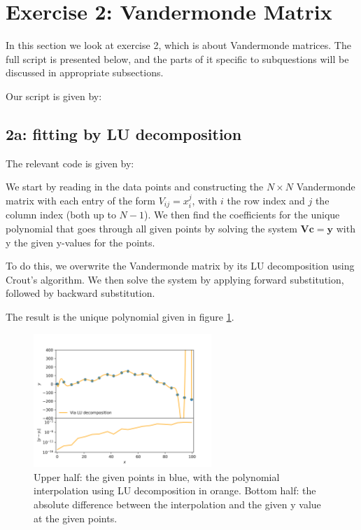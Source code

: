 \section{Exercise 2: Vandermonde Matrix}

In this section we look at exercise 2, which is about Vandermonde matrices. The full script is presented below, and the parts of it specific to subquestions will be discussed in appropriate subsections.

Our script is given by:


\subsection{2a: fitting by LU decomposition}
The relevant code is given by:


We start by reading in the data points and constructing the $N \times N$ Vandermonde matrix with each entry of the form $V_{ij} = x_i^j $, with $i$ the row index and $j$ the column index (both up to $N-1$). We then find the coefficients for the unique polynomial that goes through all given points by solving the system $\mathbf{Vc} = \mathbf{y}$ with y the given y-values for the points. 

To do this, we overwrite the Vandermonde matrix by its LU decomposition using Crout's algorithm. We then solve the system by applying forward substitution, followed by backward substitution. 

The result is the unique polynomial given in figure \ref{fig:2a}. 

\begin{figure}[h!]
\label{fig:2a}
\caption{Upper half: the given points in blue, with the polynomial interpolation using LU decomposition in orange. Bottom half: the absolute difference between the interpolation and the given y value at the given points.}
\centering
\includegraphics[width=0.6\textwidth]{my_vandermonde_sol_2a.png}
\end{figure}

